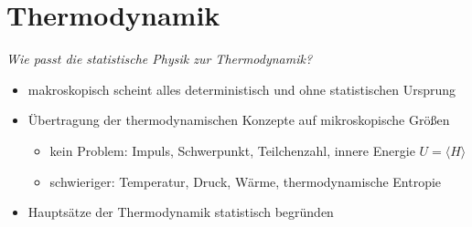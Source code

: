 \section{Thermodynamik} 

\begin{center}
    \emph{Wie passt die statistische Physik zur Thermodynamik?}
\end{center}

\begin{itemize}
    \item makroskopisch scheint alles deterministisch und ohne statistischen Ursprung
    \item Übertragung der thermodynamischen Konzepte auf mikroskopische Größen
    \begin{itemize}
        \item[]kein Problem: Impuls, Schwerpunkt, Teilchenzahl, innere Energie $U = \langle H \rangle$
        \item[]schwieriger: Temperatur, Druck, Wärme, thermodynamische Entropie 
    \end{itemize}
    \item Hauptsätze der Thermodynamik statistisch begründen
\end{itemize}

